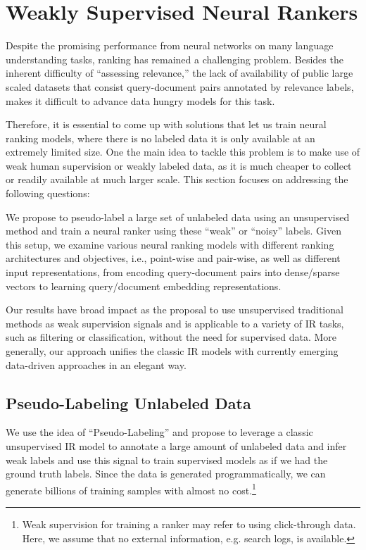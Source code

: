 \section{Weakly Supervised Neural Rankers}
\label{sec:weakly_supervised_neural_rankers}
Despite the promising performance from neural networks on many language understanding tasks, ranking has remained a challenging problem. Besides the inherent difficulty of ``assessing relevance,'' the lack of availability of public large scaled datasets that consist query-document pairs annotated by relevance labels, makes it difficult to advance data hungry models for this task.

Therefore, it is essential to come up with solutions that let us train neural ranking models, where there is no labeled data it is only available at an extremely limited size. 
One the main idea to tackle this problem is to make use of weak human supervision or weakly labeled data, as it is much cheaper to collect or readily available at much larger scale. This section focuses on addressing the following questions:

We propose to pseudo-label a large set of unlabeled data using an unsupervised method and train a neural ranker using these ``weak'' or ``noisy'' labels. Given this setup, we examine various neural ranking models with different ranking architectures and objectives, i.e., point-wise and pair-wise, as well as different input representations, from encoding query-document pairs into dense\:/\:sparse vectors to learning query\:/\:document embedding representations. 

Our results have broad impact as the proposal to use unsupervised traditional methods as weak supervision signals and is applicable to a variety of IR tasks, such as filtering or classification, without the need for supervised data.  More generally, our approach unifies the classic IR models with currently emerging data-driven approaches in an elegant way.

\subsection{Pseudo-Labeling Unlabeled Data}
\label{sec:pseudo_labeling}
We use the idea of ``Pseudo-Labeling'' and propose to leverage a classic unsupervised IR model to annotate a large amount of unlabeled data and infer weak labels and use this signal to train supervised models as if we had the ground truth labels.
Since the data is generated programmatically, we can generate billions of training samples with almost no cost.\footnote{Weak supervision for training a ranker may refer to using click-through data. Here, we assume that no external information, e.g. search logs, is available.}

